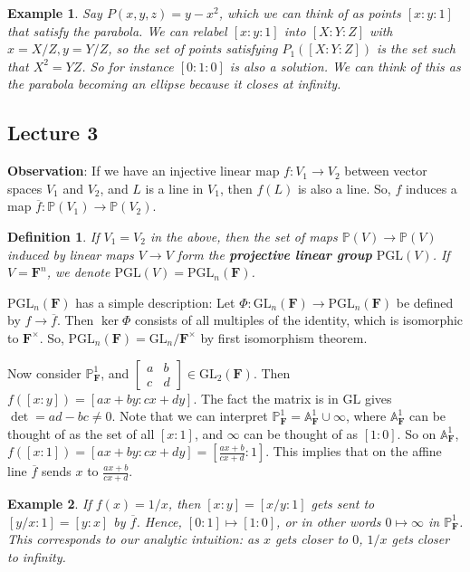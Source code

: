 \documentclass[12pt]{article}
\newcommand{\F}{\mathbf{F}}
\renewcommand{\P}{\mathbb{P}}
\newcommand{\GL}{\mathrm{GL}}
\newcommand{\A}{\mathbb{A}}
\newcommand{\PGL}{\mathrm{PGL}}
\newtheorem{definition}{Definition}[section]
\newtheorem*{example}{Example}
\begin{document}
    \begin{example}
        Say $P(x, y, z) = y - x^2$, which we can think of as points $[x:y:1]$ that satisfy the parabola. We can relabel $[x:y:1]$ into $[X:Y:Z]$ with $x = X/Z, y = Y/Z$, so the set of points satisfying $P_1([X:Y:Z])$ is the set such that $X^2 = YZ$. So for instance $[0:1:0]$ is also a solution. We can think of this as the parabola becoming an ellipse because it closes at infinity.
    \end{example}

    \subsection{Lecture 3}
    \textbf{Observation}: If we have an injective linear map $f: V_1 \to V_2$ between vector spaces $V_1$ and $V_2$, and $L$ is a line in $V_1$, then $f(L)$ is also a line. So, $f$ induces a map $\overline{f}: \P(V_1) \to \P(V_2)$.
    \begin{definition}
        If $V_1 = V_2$ in the above, then the set of maps $\P(V) \to \P(V)$ induced by linear maps $V \to V$ form the \textbf{projective linear group} $\PGL(V)$. If $V = \F^n$, we denote $\PGL(V) = \PGL_n(\F)$.
    \end{definition}
    $\PGL_n(\F)$ has a simple description: Let $\Phi: \GL_n(\F) \to \PGL_n(\F)$ be defined by $f \to \overline{f}$. Then $\ker \Phi$ consists of all multiples of the identity, which is isomorphic to $\F^\times$. So, $\PGL_n(\F) = \GL_n/\F^\times$ by first isomorphism theorem. \par
    Now consider $\P_\F^1$, and $\begin{bmatrix}
        a & b \\ c & d
    \end{bmatrix} \in \GL_2(\F)$. Then $f([x: y]) = [ax+by: cx+dy]$. The fact the matrix is in $\GL$ gives $\det = ad - bc \neq 0$. Note that we can interpret $\P_\F^1 = \A_\F^1 \cup \infty$, where $\A_\F^1$ can be thought of as the set of all $[x:1]$, and $\infty$ can be thought of as $[1:0]$. So on $\A_\F^1$, $f([x: 1]) = [ax+by: cx+dy] = [\frac{ax+b}{cx+d}:1]$. This implies that on the affine line $\overline{f}$ sends $x$ to $\frac{ax+b}{cx+d}$.
    \begin{example}
        If $f(x) = 1/x$, then $[x:y] = [x/y:1]$ gets sent to $[y/x:1] = [y:x]$ by $\overline{f}$. Hence, $[0:1] \mapsto [1:0]$, or in other words $0 \mapsto \infty$ in $\P_\F^1$. This corresponds to our analytic intuition: as $x$ gets closer to $0$, $1/x$ gets closer to infinity.
    \end{example}
\end{document}
